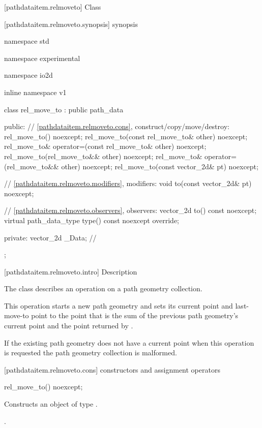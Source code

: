  [pathdataitem.relmoveto] {Class }

 [pathdataitem.relmoveto.synopsis] { synopsis}

\begin{codeblock}
namespace std { namespace experimental { namespace io2d { inline namespace v1 {
  class rel_move_to : public path_data {
  public:
    // \ref{pathdataitem.relmoveto.cons}, construct/copy/move/destroy:
    rel_move_to() noexcept;
    rel_move_to(const rel_move_to& other) noexcept;
    rel_move_to& operator=(const rel_move_to& other) noexcept;
    rel_move_to(rel_move_to&& other) noexcept;
    rel_move_to& operator=(rel_move_to&& other) noexcept;
    rel_move_to(const vector_2d& pt) noexcept;

    // \ref{pathdataitem.relmoveto.modifiers}, modifiers:
    void to(const vector_2d& pt) noexcept;

    // \ref{pathdataitem.relmoveto.observers}, observers:
    vector_2d to() const noexcept;
    virtual path_data_type type() const noexcept override;
    
  private:
    vector_2d _Data; // \expos
  };
} } } }
\end{codeblock}

 [pathdataitem.relmoveto.intro] { Description}

\pnum
{}
The class  describes an operation on a path geometry collection.

\pnum
This operation starts a new path geometry and sets its current point and last-move-to point to the point that is the sum of the previous path geometry's current point and the point returned by .

\pnum
If the existing path geometry does not have a current point when this operation is requested the path geometry collection is malformed.

 [pathdataitem.relmoveto.cons] { constructors and assignment operators}

\begin{itemdecl}
    rel_move_to() noexcept;
\end{itemdecl}
\begin{itemdescr}
	\pnum
	\effects
	Constructs an object of type .
	
	\pnum
	\postconditions
	.
\end{itemdescr}

